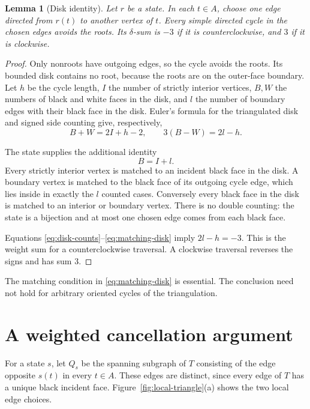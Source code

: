 \documentclass[11pt]{article}
\newtheorem{lemma}[theorem]{Lemma}
\theoremstyle{remark}
\numberwithin{equation}{section}
\begin{document}
\begin{lemma}[Disk identity]\label{lem:disk}
Let \(r\) be a state. In each \(t\in A\), choose one edge
directed from \(r(t)\) to another vertex of \(t\).
Every simple directed cycle in the chosen edges avoids the
roots. Its \(\delta\)-sum is \(-3\) if it is counterclockwise,
and \(3\) if it is clockwise.
\end{lemma}

\begin{proof}
Only nonroots have outgoing edges, so the cycle avoids the
roots. Its bounded disk contains no root, because the roots
are on the outer-face boundary. Let \(h\) be the cycle length,
\(I\) the number of strictly interior vertices, \(B,W\) the
numbers of black and white faces in the disk, and \(l\) the
number of boundary edges with their black face in the disk.
Euler's formula for the triangulated disk and signed side
counting give, respectively,
\begin{equation}\label{eq:disk-counts}
 B+W=2I+h-2,\qquad 3(B-W)=2l-h.
\end{equation}

The state supplies the additional identity
\begin{equation}\label{eq:matching-disk}
 B=I+l.
\end{equation}
Every strictly interior vertex is matched to an incident
black face in the disk. A boundary vertex is matched to the
black face of its outgoing cycle edge, which lies inside in
exactly the \(l\) counted cases. Conversely every black face
in the disk is matched to an interior or boundary vertex.
There is no double counting: the state is a bijection and
at most one chosen edge comes from each black face.

Equations \eqref{eq:disk-counts}--\eqref{eq:matching-disk}
imply \(2l-h=-3\). This is the weight sum for a
counterclockwise traversal. A clockwise traversal reverses
the signs and has sum \(3\).
\end{proof}

The matching condition in \eqref{eq:matching-disk} is essential.
The conclusion need not hold for arbitrary oriented cycles
of the triangulation.

\section{A weighted cancellation argument}\label{sec:cancellation}

For a state \(s\), let \(Q_s\) be the spanning subgraph of
\(T\) consisting of the edge opposite \(s(t)\) in every
\(t\in A\). These edges are distinct, since every edge of
\(T\) has a unique black incident face.
Figure~\ref{fig:local-triangle}(a) shows the two local edge choices.
\end{document}
